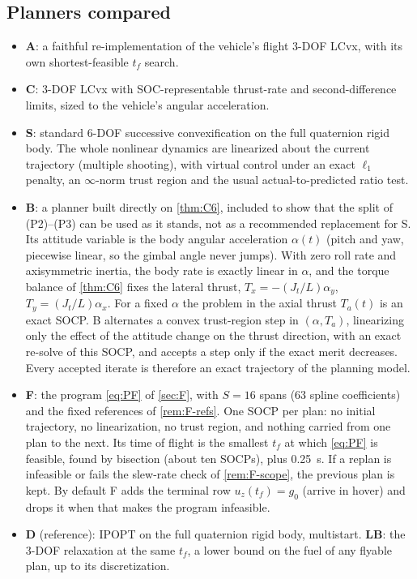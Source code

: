\subsection{Planners compared}
\begin{itemize}[leftmargin=*,itemsep=2pt]
\item \textbf{A}: a faithful re-implementation of the vehicle's flight 3-DOF LCvx, with its own shortest-feasible $t_f$ search.
\item \textbf{C}: 3-DOF LCvx with SOC-representable thrust-rate and second-difference limits, sized to the vehicle's angular
acceleration.
\item \textbf{S}: standard 6-DOF successive convexification \cite{szmuk2018gnc,reynolds2020ptr} on the full quaternion rigid body.
The whole nonlinear dynamics are linearized about the current trajectory (multiple shooting), with virtual control under an exact
$\ell_1$ penalty, an $\infty$-norm trust region and the usual actual-to-predicted ratio test.
\item \textbf{B}: a planner built directly on \cref{thm:C6}, included to show that the split of (P2)--(P3) can be used as it
stands, not as a recommended replacement for S. Its attitude variable is the body angular acceleration $\alpha(t)$ (pitch and yaw,
piecewise linear, so the gimbal angle never jumps). With zero roll rate and axisymmetric inertia, the body rate is exactly linear in
$\alpha$, and the torque balance of \cref{thm:C6} fixes the lateral thrust, $T_x=-(J_t/L)\alpha_y$, $T_y=(J_t/L)\alpha_x$. For a
fixed $\alpha$ the problem in the axial thrust $T_a(t)$ is an exact SOCP. B alternates a convex trust-region step in
$(\alpha,T_a)$, linearizing only the effect of the attitude change on the thrust direction, with an exact re-solve of this SOCP, and
accepts a step only if the exact merit decreases. Every accepted iterate is therefore an exact trajectory of the planning model.
\item \textbf{F}: the program \eqref{eq:PF} of \cref{sec:F}, with $S=16$ spans (63 spline coefficients) and the fixed references of
\cref{rem:F-refs}. One SOCP per plan: no initial trajectory, no linearization, no trust region, and nothing carried from one plan to
the next. Its time of flight is the smallest $t_f$ at which \eqref{eq:PF} is feasible, found by bisection (about ten SOCPs), plus
0.25~s. If a replan is infeasible or fails the slew-rate check of \cref{rem:F-scope}, the previous plan is kept. By default F adds
the terminal row $u_z(t_f)=g_0$ (arrive in hover) and drops it when that makes the program infeasible.
\item \textbf{D} (reference): IPOPT on the full quaternion rigid body, multistart. \textbf{LB}: the 3-DOF relaxation at the same
$t_f$, a lower bound on the fuel of any flyable plan, up to its discretization.
\end{itemize}
